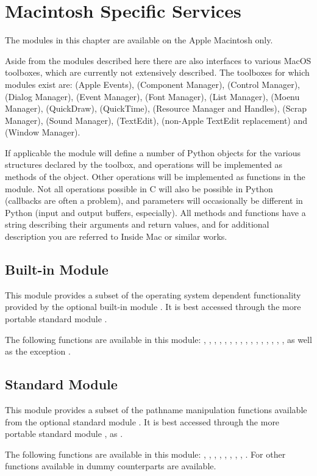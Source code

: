 \chapter{Macintosh Specific Services}

The modules in this chapter are available on the Apple Macintosh only.

Aside from the modules described here there are also interfaces to
various MacOS toolboxes, which are currently not extensively
described. The toolboxes for which modules exist are:
 (Apple Events),
 (Component Manager),
 (Control Manager),
 (Dialog Manager),
 (Event Manager),
 (Font Manager),
 (List Manager),
 (Moenu Manager),
 (QuickDraw),
 (QuickTime),
 (Resource Manager and Handles),
 (Scrap Manager),
 (Sound Manager),
 (TextEdit),
 (non-Apple TextEdit replacement) and
 (Window Manager).

If applicable the module will define a number of Python objects for
the various structures declared by the toolbox, and operations will be
implemented as methods of the object. Other operations will be
implemented as functions in the module. Not all operations possible in
C will also be possible in Python (callbacks are often a problem), and
parameters will occasionally be different in Python (input and output
buffers, especially). All methods and functions have a 
string describing their arguments and return values, and for
additional description you are referred to Inside Mac or similar
works.

\section{Built-in Module }

This module provides a subset of the operating system dependent
functionality provided by the optional built-in module .
It is best accessed through the more portable standard module
.

The following functions are available in this module:
,
,
,
,
,
,
,
,
,
,
,
,
,
,
,
,
as well as the exception .

\section{Standard Module }

This module provides a subset of the pathname manipulation functions
available from the optional standard module .  It is
best accessed through the more portable standard module , as
.

The following functions are available in this module:
,
,
,
,
,
,
,
,
.
For other functions available in  dummy counterparts
are available.
